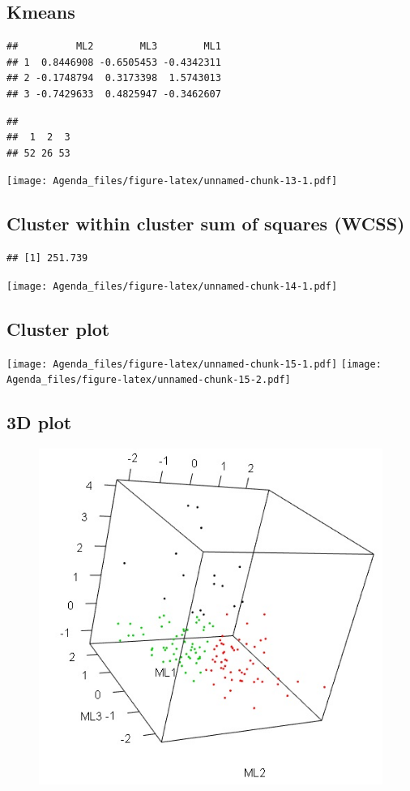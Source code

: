 \documentclass[]{article}
\begin{document}
\subsection{Kmeans}\label{kmeans}

\begin{verbatim}
##          ML2        ML3        ML1
## 1  0.8446908 -0.6505453 -0.4342311
## 2 -0.1748794  0.3173398  1.5743013
## 3 -0.7429633  0.4825947 -0.3462607
\end{verbatim}

\begin{verbatim}
## 
##  1  2  3 
## 52 26 53
\end{verbatim}

\texttt{[image: Agenda\_files/figure-latex/unnamed-chunk-13-1.pdf]}

\subsection{Cluster within cluster sum of squares
(WCSS)}\label{cluster-within-cluster-sum-of-squares-wcss}

\begin{verbatim}
## [1] 251.739
\end{verbatim}

\texttt{[image: Agenda\_files/figure-latex/unnamed-chunk-14-1.pdf]}

\subsection{Cluster plot}\label{cluster-plot}

\texttt{[image: Agenda\_files/figure-latex/unnamed-chunk-15-1.pdf]}
\texttt{[image: Agenda\_files/figure-latex/unnamed-chunk-15-2.pdf]}

\subsection{3D plot}\label{d-plot}

\begin{figure}
\centering
\includegraphics{./Figs/3D.jpg}
\caption{}
\end{figure}
\end{document}
